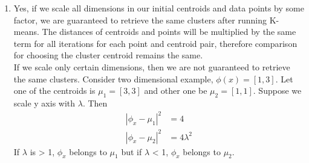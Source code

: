 \documentclass[12pt]{article}
\begin{document}
\begin{enumerate}[label=(\alph*)]
	 \item Yes, if we scale all dimensions in our initial centroids and data points by some factor, we are guaranteed to retrieve the same clusters after running K-means. The distances of centroids and points will be multiplied by the same term for all iterations for each point and centroid pair, therefore comparison for choosing the cluster centroid remains the same. \\
	 If we scale only certain dimensions, then we are not guaranteed to retrieve the same clusters. Consider two dimensional example, $\phi (x) = [1,3]$. Let one of the centroids is $\mu_1 = [3,3]$ and other one be $\mu_2 = [1,1]$. Suppose we scale y axis with $\lambda$. Then
	 \begin{align*}
	 |\phi_x - \mu_1|^2 &= 4 \\
	 |\phi_x - \mu_2|^2 &= 4\lambda^2
	 \end{align*}
If $\lambda$ is > 1, $\phi_x$ belongs to $\mu_1$ but if $\lambda$ < 1, $\phi_x$ belongs to $\mu_2$.


\end{enumerate}

 
\end{document}
